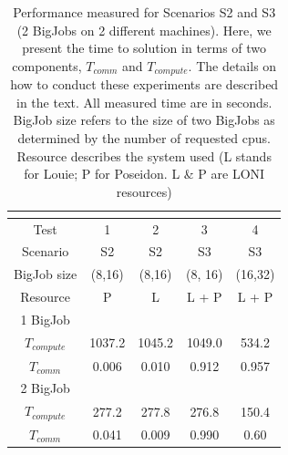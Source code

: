 \documentclass[conference,final]{IEEEtran}
\newcommand{\jhanote}[1]{ {\textcolor{red} { ***Jha: #1 }}}
\newcommand{\Jkimnote}[1]{ {\textcolor{red} { ***Jkim: #1 }}}
\newcommand{\jhanote}[1]{}
\newcommand{\Jkimnote}[1]{}
\begin{document}

\begin{table}[!h]
\begin{center}
  \caption{\small Performance measured for Scenarios S2 and S3 (2
    BigJobs on 2 different machines).  Here, we present the time to
    solution in terms of two components, ${T_{comm}}$ and
   ${T_{compute}}$.  The details on how to conduct these experiments
    are described in the text.  All measured time are in seconds.
    BigJob size refers to the size of two BigJobs as determined by the
    number of requested cpus. Resource describes the system used (L
    stands for Louie; P for Poseidon. L \& P are LONI resources) }
\label{table:TwoBigJobs}
\begin{tabular}{ c || c  c  c  c}
  \multicolumn{5}{c}{\phantom{\tiny 100}}\\
\hline
Test & 1 & 2 & 3 & 4  \\

\hline
Scenario & S2 & S2 & S3 & S3 \\
BigJob size & (8,16)  & (8,16) & (8, 16) & (16,32) \\
Resource & P  & L  &  L + P & L + P \\
\hline
1 BigJob &   & & & \\
${T_{compute}}$ & 1037.2& 1045.2 & 1049.0 & 534.2\\
${T_{comm}}$ & 0.006 & 0.010 & 0.912 & 0.957 \\
\hline
2 BigJob  &   & & & \\
${T_{compute}}$ & 277.2 & 277.8& 276.8 & 150.4 \\
${T_{comm}}$ & 0.041 & 0.009 &  0.990 & 0.60 \\
\hline
\end{tabular}
\end{center}
\end{table}
\end{document}
